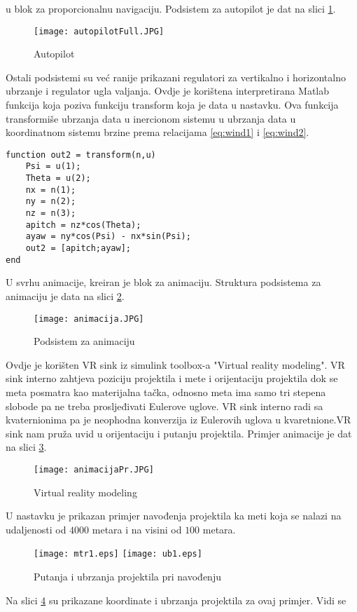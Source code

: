 u blok za proporcionalnu navigaciju. 
Podsistem za autopilot je dat na slici \ref{fig:autopilotFull}. 
\begin{figure}[!ht]
    \centering
    \texttt{[image: autopilotFull.JPG]}
    \caption{Autopilot}
    \label{fig:autopilotFull}
\end{figure}
Ostali podsistemi su već ranije prikazani regulatori za vertikalno i horizontalno ubrzanje 
i regulator ugla valjanja. 
Ovdje je korištena interpretirana Matlab funkcija koja poziva 
funkciju transform koja je data u nastavku. Ova funkcija transformiše 
ubrzanja data u inercionom sistemu u ubrzanja data u koordinatnom sistemu brzine 
prema relacijama \ref{eq:wind1} i \ref{eq:wind2}.
\begin{lstlisting}
function out2 = transform(n,u)
    Psi = u(1);
    Theta = u(2);
    nx = n(1);
    ny = n(2);
    nz = n(3);
    apitch = nz*cos(Theta);
    ayaw = ny*cos(Psi) - nx*sin(Psi);
    out2 = [apitch;ayaw];
end
\end{lstlisting}
U svrhu animacije, kreiran je blok za animaciju. Struktura podsistema za animaciju je data na 
slici \ref{fig:animacija}.
\begin{figure}
    \centering
    \texttt{[image: animacija.JPG]}
    \caption{Podsistem za animaciju}
    \label{fig:animacija}
\end{figure}
Ovdje je korišten VR sink iz simulink toolbox-a "Virtual reality modeling". 
VR sink interno zahtjeva poziciju projektila i mete i orijentaciju projektila dok se 
meta posmatra kao materijalna tačka, odnosno meta ima samo tri stepena slobode pa ne treba 
prosljeđivati Eulerove uglove. VR sink interno radi sa kvaternionima pa je neophodna konverzija 
iz Eulerovih uglova u kvaretnione.VR sink nam pruža uvid u orijentaciju i 
putanju projektila. Primjer animacije je dat na slici \ref{fig:prAnimacija}.
\begin{figure}
    \centering
    \texttt{[image: animacijaPr.JPG]}
    \caption{Virtual reality modeling}
    \label{fig:prAnimacija}
\end{figure}
U nastavku je prikazan primjer navođenja projektila ka meti koja se nalazi na udaljenosti 
od $4000$ metara i na visini od $100$ metara. 
\begin{figure}[!ht]
    \centering
    \texttt{[image: mtr1.eps]}
    \texttt{[image: ub1.eps]}
    \caption{Putanja i ubrzanja projektila pri navođenju}
    \label{fig:ub1}
\end{figure}
Na slici \ref{fig:ub1} su prikazane koordinate i ubrzanja projektila za ovaj primjer. Vidi se 
